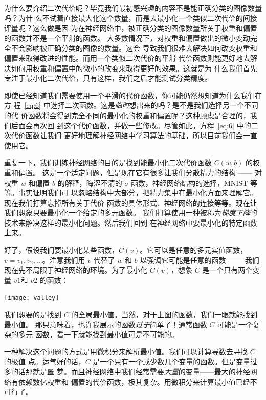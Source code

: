 为什么要介绍二次代价呢？毕竟我们最初感兴趣的内容不是能正确分类的图像数量吗？为什
么不试着直接最大化这个数量，而是去最小化一个类似二次代价的间接评量呢？这么做是因
为在神经网络中，被正确分类的图像数量所关于权重和偏置的函数并不是一个平滑的函数。
大多数情况下，对权重和偏置做出的微小变动完全不会影响被正确分类的图像的数量。这会
导致我们很难去解决如何改变权重和偏置来取得改进的性能。而用一个类似二次代价的平滑
代价函数则能更好地去解决如何用权重和偏置中的微小的改变来取得更好的效果。这就是为
什么我们首先专注于最小化二次代价，只有这样，我们之后才能测试分类精度。

即使已经知道我们需要使用一个平滑的代价函数，你可能仍然想知道为什么我们在方
程~\eqref{eq:6} 中选择二次函数。这是\emph{临时}想出来的吗？是不是我们选择另一个不同的代
价函数将会得到完全不同的最小化的权重和偏置呢？这种顾虑是合理的，我们后面会再次回
到这个代价函数，并做一些修改。尽管如此，方程~\eqref{eq:6} 中的二次代价函数让我们
更好地理解神经网络中学习算法的基础，所以目前我们会一直使用它。

重复一下，我们训练神经网络的目的是找到能最小化二次代价函数 $C(w,b)$ 的权重和偏置。
这是一个适定问题，但是现在它有很多让我们分散精力的结构 —— 对权重 $w$ 和偏置 $b$
的解释，晦涩不清的 $\sigma$ 函数，神经网络结构的选择，MNIST 等等。事实证明我们可
以忽略结构中大部分，把精力集中在最小化方面来理解它。现在我们打算忘掉所有关于代价
函数的具体形式、神经网络的连接等等。现在让我们想象只要最小化一个给定的多元函数。
我们打算使用一种被称为\emph{梯度下降}的技术来解决这样的最小化问题。然后我们回到
在神经网络中要最小化的特定函数上来。

好了，假设我们要最小化某些函数，$C(v)$。它可以是任意的多元实值函数，$v = v_1,
v_2, \ldots$。注意我们用 $v$ 代替了 $w$ 和 $b$ 以强调它可能是任意的函数 —— 我们
现在先不局限于神经网络的环境。为了最小化 $C(v)$，想象 $C$ 是一个只有两个变量
$v1$和 $v2$ 的函数：
\begin{center}
  \texttt{[image: valley]}
\end{center}

我们想要的是找到 $C$ 的全局最小值。当然，对于上图的函数，我们一眼就能找到最小值。
那只意味着，也许我展示的函数\emph{过于}简单了！通常函数 $C$ 可能是一个复杂的多元
函数，看一下就能找到最小值可是不可能的。

一种解决这个问题的方式是用微积分来解析最小值。我们可以计算导数去寻找 $C$ 的极值
点。运气好的话，$C$ 是一个只有一个或少数几个变量的函数。但是变量过多的话那就是噩
梦。而且神经网络中我们经常需要\emph{大量}的变量——最大的神经网络有依赖数亿权重和
偏置的代价函数，极其复杂。用微积分来计算最小值已经不可行了。

